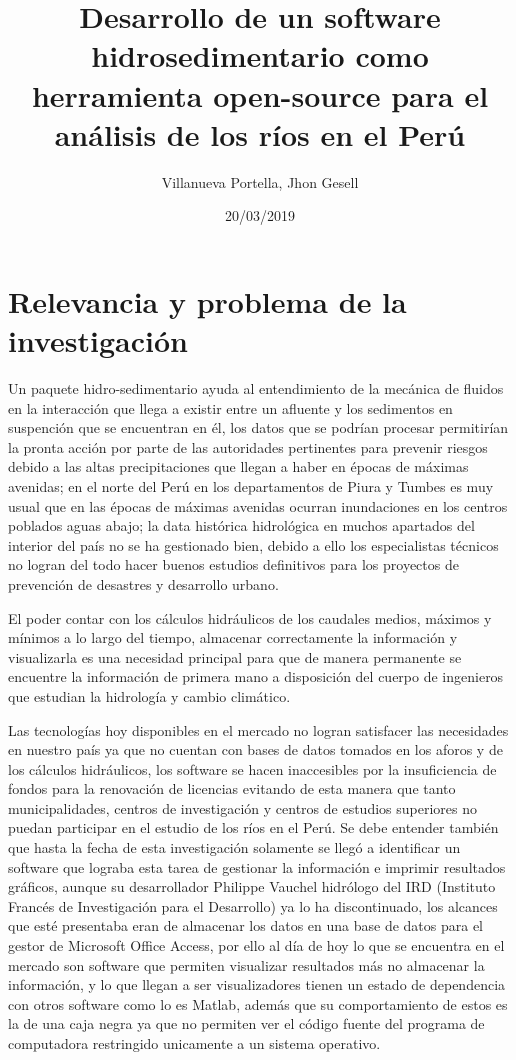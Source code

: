 \documentclass[12pt,a4paper]{report}
\begin{document}
\title{Desarrollo de un software hidrosedimentario como herramienta open-source para el análisis de los ríos en el Perú}
\author{Villanueva Portella, Jhon Gesell}
\date{20/03/2019}
\maketitle
\section{Relevancia y problema de la investigación}
Un paquete hidro-sedimentario ayuda al entendimiento de la mecánica de fluidos en la interacción que llega a existir entre un afluente y los sedimentos en suspención que se encuentran en él, los datos que se podrían procesar permitirían la pronta acción por parte de las autoridades pertinentes para prevenir riesgos debido a las altas precipitaciones que llegan a haber en épocas de máximas avenidas; en el norte del Perú en los departamentos de Piura y Tumbes es muy usual que en las épocas de máximas avenidas ocurran inundaciones en los centros poblados aguas abajo; la data histórica hidrológica en muchos apartados del interior del país no se ha gestionado bien, debido a ello los especialistas técnicos no logran del todo hacer buenos estudios definitivos para los proyectos de prevención de desastres y desarrollo urbano.

El poder contar con los cálculos hidráulicos de los caudales medios, máximos y mínimos a lo largo del tiempo, almacenar correctamente la información y visualizarla es una necesidad principal para que de manera permanente se encuentre la información de primera mano a disposición del cuerpo de ingenieros que estudian la hidrología y cambio climático.

Las tecnologías hoy disponibles en el mercado no logran satisfacer las necesidades en nuestro país ya que no cuentan con bases de datos tomados en los aforos y de los cálculos hidráulicos, los software se hacen inaccesibles por la insuficiencia de fondos para la renovación de licencias evitando de esta manera que tanto municipalidades, centros de investigación y centros de estudios superiores no puedan participar en el estudio de los ríos en el Perú. Se debe entender también que hasta la fecha de esta investigación solamente se llegó a identificar un software que lograba esta tarea de gestionar la información e imprimir resultados gráficos, aunque su desarrollador Philippe Vauchel hidrólogo del IRD (Instituto Francés de Investigación para el Desarrollo) ya lo ha discontinuado, los alcances que esté presentaba eran de almacenar los datos en una base de datos para el gestor de Microsoft Office Access, por ello al día de hoy lo que se encuentra en el mercado son software que permiten visualizar resultados más no almacenar la información, y lo que llegan a ser visualizadores tienen un estado de dependencia con otros software como lo es Matlab, además que su comportamiento de estos es la de una caja negra ya que no permiten ver el código fuente del programa de computadora restringido unicamente a un sistema operativo.
\end{document}
